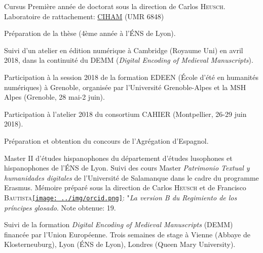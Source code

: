  \begin{rubric}{Cursus}
                                \entry*[2018-2019]
                            Première année de doctorat sous la direction de Carlos
                        \textsc{Heusch}. Laboratoire de rattachement: \href{http://ciham.ish-lyon.cnrs.fr/}{CIHAM} (UMR 6848)
                    
                                \entry*[2017-2018]
                            Préparation de la thèse (4ème année à l'ÉNS de Lyon). 
                    
                                \entry*
                            Suivi d'un atelier en édition numérique à Cambridge (Royaume Uni) en
                        avril 2018, dans la continuité du DEMM (\textit{Digital Encoding of Medieval
                        Manuscripts}).
                    
                                \entry*
                            Participation à la session 2018 de la formation EDEEN (École d'été en
                        humanités numériques) à Grenoble, organisée par l'Université Grenoble-Alpes
                        et la MSH Alpes (Grenoble, 28 mai-2 juin).
                    
                                \entry*
                            Participation à l'atelier 2018 du consortium CAHIER (Montpellier,
                        26-29 juin 2018).
                    
                                \entry*[2016-2017]
                            Préparation et obtention du concours de l'Agrégation d'Espagnol. 
                    
                                \entry*[2015-2016]
                             Master II d'études hispanophones du département d'études lusophones
                        et hispanophones de l'ÉNS de Lyon. Suivi des cours Master \textit{Patrimonio
                        Textual y humanidades digitales} de l’Université de Salamanque dans
                        le cadre du programme Erasmus. Mémoire préparé sous la direction de
                        Carlos \textsc{Heusch} et de Francisco \textsc{Bautista}\href{https://orcid.org/0000-0002-2676-0388}{\texttt{[image: ../img/orcid.png]}}: "\textit{La
                        version B du \textit{Regimiento de los príncipes}
                        glosado}. Note obtenue: 19. 
                    
                                \entry*
                            Suivi de la formation \textit{Digital Encoding of Medieval
                        Manuscripts} (DEMM) financée par l’Union Européenne. Trois semaines de
                        stage à Vienne (Abbaye de Klosterneuburg), Lyon (ÉNS de Lyon), Londres
                        (Queen Mary University). 
                    

\end{rubric}
